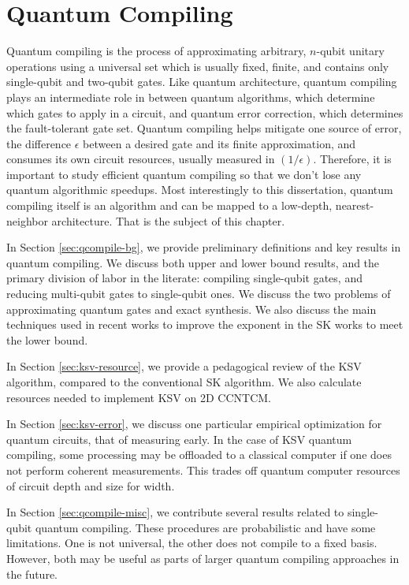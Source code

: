 \chapter{Quantum Compiling}
\label{chap:qcompile}

Quantum compiling is the process of approximating arbitrary,
$n$-qubit unitary operations using a universal set which
is usually fixed, finite, and contains only single-qubit
and two-qubit gates. Like quantum architecture, quantum
compiling plays an intermediate role in between quantum
algorithms, which determine which gates to apply in a circuit,
and quantum error correction, which determines the
fault-tolerant gate set.
Quantum compiling helps mitigate one source of error,
the difference $\epsilon$ between a desired gate and its
finite approximation,
and consumes its own circuit resources, usually measured in
$(1 / \epsilon)$.
Therefore, it is important to study efficient quantum 
compiling so that we don't lose any quantum algorithmic speedups.
Most interestingly to this dissertation, quantum compiling itself
is an algorithm and can be mapped to a low-depth, nearest-neighbor
architecture. That is the subject of this chapter.

In Section \ref{sec:qcompile-bg}, we provide preliminary definitions
and key results in quantum compiling. We discuss both upper
and lower bound results, and the primary division of labor in
the literate: compiling single-qubit gates, and reducing
multi-qubit gates to single-qubit ones. We discuss the
two problems of approximating quantum gates and exact synthesis.
We also discuss the main techniques used in recent works
to improve the exponent in the SK works to meet the lower
bound.

In Section \ref{sec:ksv-resource}, we provide a pedagogical
review of the KSV algorithm, compared to the conventional SK
algorithm. We also calculate resources needed to implement
KSV on 2D CCNTCM.

In Section \ref{sec:ksv-error}, we discuss one particular
empirical optimization for quantum circuits, that of measuring
early. In the case of KSV quantum compiling, some
processing may be offloaded to a classical computer if one does
not perform coherent measurements. This trades off quantum
computer resources of circuit depth and size for width.

In Section \ref{sec:qcompile-misc}, we contribute several
results related to single-qubit quantum compiling. These
procedures are probabilistic and have some limitations.
One is not universal, the other does not compile to a
fixed basis. However, both may be useful as parts of
larger quantum compiling approaches in the future.

